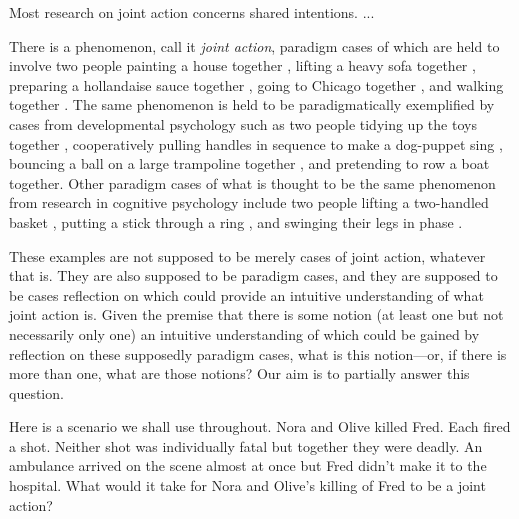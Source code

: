 \documentclass[12pt,a4paper]{extarticle}
\begin{document}
Most research on joint action concerns shared intentions. ...




There is a phenomenon, call it \emph{joint action}, paradigm cases of which are held to involve two people 
	painting a house together \citep{Bratman:1992mi}, 
	lifting a heavy sofa together \citep{Velleman:1997oo}, 
	preparing a hollandaise sauce together \citep{Searle:1990em}, 
	going to Chicago together \citep{Kutz:2000si}, 
	and walking together \citep{gilbert_walking_1990}.
The same phenomenon is held to be paradigmatically exemplified by cases from developmental psychology such as two people 
	tidying up the toys together \citep{Behne:2005qh},
	cooperatively pulling handles in sequence to make a dog-puppet sing \citep{Brownell:2006gu},
	bouncing a ball on a large trampoline together \citep{Tomasello:2007gl},
	and pretending to row a boat together.
Other paradigm cases of what is thought to be the same phenomenon  from research in cognitive psychology include two people
	lifting a two-handled basket  \citep{Knoblich:2008hy},
	putting a stick through a ring \citep{ramenzoni_joint_2011},
	and swinging their legs in phase \citep[p. 284]{schmidt_richardons:_2008}.

These examples are not supposed to be merely cases of joint action, whatever that is.
They are also supposed to be paradigm cases, 
and they are supposed to be cases reflection on which could provide an intuitive understanding of what joint action is.
Given the premise that there is some notion (at least one but not necessarily only one) an intuitive understanding of which could be gained by reflection on these supposedly paradigm cases, what is this notion---or, if there is more than one, what are those notions?
Our aim is to partially answer this question.

Here is a scenario we shall use throughout.
Nora and Olive killed Fred.  
Each fired a shot.
Neither shot was individually fatal but together they were deadly.
An ambulance arrived on the scene almost at once but Fred didn't make it to the hospital.
What would it take for Nora and Olive's killing of Fred to be a joint action?
\end{document}
